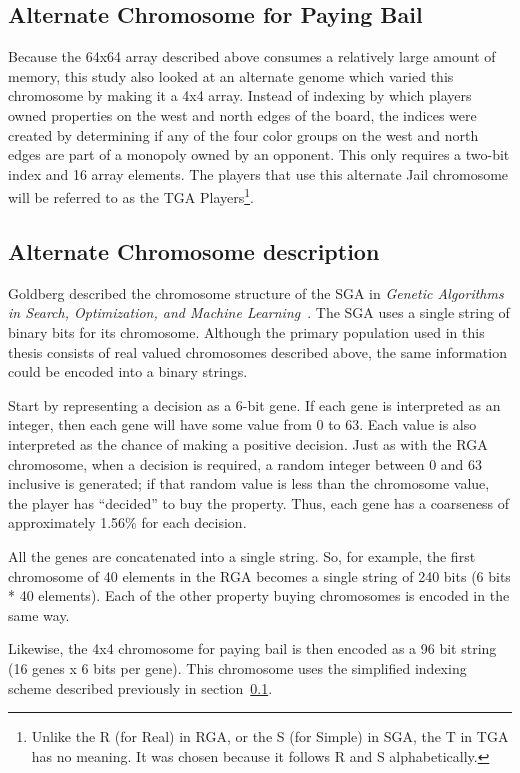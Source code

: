\subsection{Alternate Chromosome for Paying Bail} \label{5_altjail}

Because the 64x64 array described above consumes a relatively large amount of
memory, this study also looked at an alternate genome which varied this
chromosome by making it a 4x4 array. Instead of indexing by which players owned
properties on the west and north edges of the board, the indices were created by
determining if any of the four color groups on the west and north edges are part
of a monopoly owned by an opponent. This only requires a two-bit index and 16
array elements. The players that use this alternate Jail chromosome will be
referred to as the TGA Players\footnote{Unlike the R (for Real) in RGA, or the S
(for Simple) in SGA, the T in TGA has no meaning. It was chosen because it
follows R and S alphabetically.}.

\subsection{Alternate Chromosome description} \label{5_altchromo}

Goldberg described the chromosome structure of the SGA in \emph{Genetic
Algorithms in Search, Optimization, and Machine
Learning}~\cite{goldberg1989genetic}. The SGA uses a single string of
binary bits for its chromosome. Although the primary population used in this thesis
consists of real valued chromosomes described above, the same information could
be encoded into a binary strings.

Start by representing a decision as a 6-bit gene. If each gene is interpreted as
an integer, then each gene will have some value from 0 to 63. Each value is also
interpreted as the chance of making a positive decision. Just as with the RGA
chromosome, when a decision is required, a random integer between 0 and 63
inclusive is generated; if that random value is less than the chromosome value,
the player has ``decided'' to buy the property. Thus, each gene has a
coarseness of approximately 1.56\% for each decision.

All the genes are concatenated into a single string. So, for
example, the first chromosome of 40 elements in the RGA becomes a single string
of 240 bits (6 bits * 40 elements). Each of the other property buying
chromosomes is encoded in the same way.

Likewise, the 4x4 chromosome for paying bail is then encoded as a 96 bit string
(16 genes x 6 bits per gene). This chromosome uses the simplified indexing
scheme described previously in section~\ref{5_altjail}.

